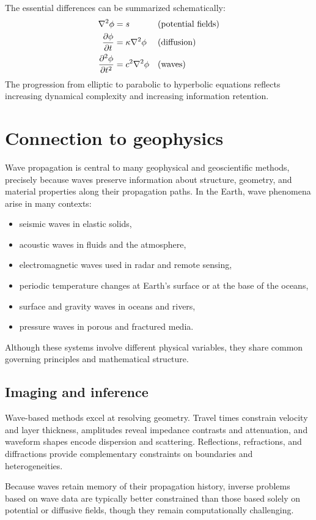 The essential differences can be summarized schematically:
\begin{align*}
    \laplacian{\phi} &= s && \text{(potential fields)} \\
    \pdv{\phi}{t} &= \kappa \laplacian{\phi} && \text{(diffusion)} \\
    \pdv[2]{\phi}{t} &= c^2 \laplacian{\phi} && \text{(waves)}
\end{align*}
The progression from elliptic to parabolic to hyperbolic equations reflects increasing dynamical complexity and increasing information retention.

\section{Connection to geophysics}
Wave propagation is central to many geophysical and geoscientific methods, precisely because waves preserve information about structure, geometry, and material properties along their propagation paths.
In the Earth, wave phenomena arise in many contexts:
\begin{itemize}
    \item seismic waves in elastic solids,
    \item acoustic waves in fluids and the atmosphere,
    \item electromagnetic waves used in radar and remote sensing,
    \item periodic temperature changes at Earth's surface or at the base of the oceans,
    \item surface and gravity waves in oceans and rivers,
    \item pressure waves in porous and fractured media.
\end{itemize}

Although these systems involve different physical variables, they share common governing principles and mathematical structure.

\subsection{Imaging and inference}
Wave-based methods excel at resolving geometry. Travel times constrain velocity and layer thickness, amplitudes reveal impedance contrasts and attenuation, and waveform shapes encode dispersion and scattering. Reflections, refractions, and diffractions provide complementary constraints on boundaries and heterogeneities.

Because waves retain memory of their propagation history, inverse problems based on wave data are typically better constrained than those based solely on potential or diffusive fields, though they remain computationally challenging.

